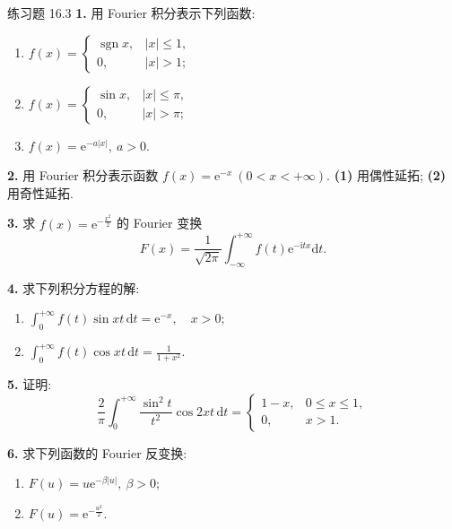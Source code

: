 \begin{exblock}{练习题 16.3}
\textbf{1.} 用 Fourier 积分表示下列函数:
\begin{enumerate}
\item $f(x)=\begin{cases}\operatorname{sgn}x,&|x|\leqslant1,\\0,&|x|>1;\end{cases}$
\item $f(x)=\begin{cases}\sin x,&|x|\leqslant\pi,\\0,&|x|>\pi;\end{cases}$
\item $f(x)=\mathrm{e}^{-a|x|},\ a>0.$
\end{enumerate}

\textbf{2.} 用 Fourier 积分表示函数 $f(x)=\mathrm{e}^{-x}\ (0<x<+\infty)$. \textbf{(1)} 用偶性延拓; \textbf{(2)} 用奇性延拓.

\textbf{3.} 求 $f(x)=\mathrm{e}^{-\frac{x^{2}}{2}}$ 的 Fourier 变换
\[
  F(x)=\frac{1}{\sqrt{2\pi}}\int_{-\infty}^{+\infty}f(t)\mathrm{e}^{-\mathrm{i}tx}\mathrm{d}t.
\]

\textbf{4.} 求下列积分方程的解:
\begin{enumerate}
\item $\displaystyle\int_{0}^{+\infty}f(t)\sin xt\,\mathrm{d}t=\mathrm{e}^{-x},\quad x>0;$
\item $\displaystyle\int_{0}^{+\infty}f(t)\cos xt\,\mathrm{d}t=\frac{1}{1+x^{2}}.$
\end{enumerate}

\textbf{5.} 证明:
\[
  \frac{2}{\pi}\int_{0}^{+\infty}\frac{\sin^{2}t}{t^{2}}\cos 2xt\,\mathrm{d}t=
  \begin{cases}
    1-x,&0\leqslant x\leqslant1,\\
    0,&x>1.
\end{cases}
\]

\textbf{6.} 求下列函数的 Fourier 反变换:
\begin{enumerate}
\item $F(u)=u\mathrm{e}^{-\beta|u|},\ \beta>0;$
\item $F(u)=\mathrm{e}^{-\frac{u^{2}}{2}}.$
\end{enumerate}
\end{exblock}
